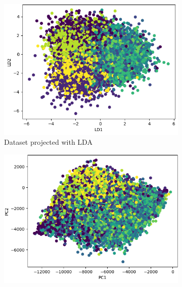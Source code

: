 \documentclass[a4paper]{article}
\theoremstyle{plain}
\theoremstyle{definition}
\begin{document}
{\begin{figure}[h]
\centering
\begin{subfigure}{0.32\textwidth} %
  \centering
  \includegraphics[width=\linewidth]{Figures/LDA.png} %
  \captionsetup{font=scriptsize} %
  \caption{Dataset projected with LDA}
  \label{fig:sub1}
\end{subfigure}%
\hfill %
\begin{subfigure}{0.32\textwidth} %
  \centering
  \includegraphics[width=\linewidth]{Figures/PCA.png}
  \captionsetup{font=scriptsize} %

\end{subfigure}
\end{figure}}
\end{document}

